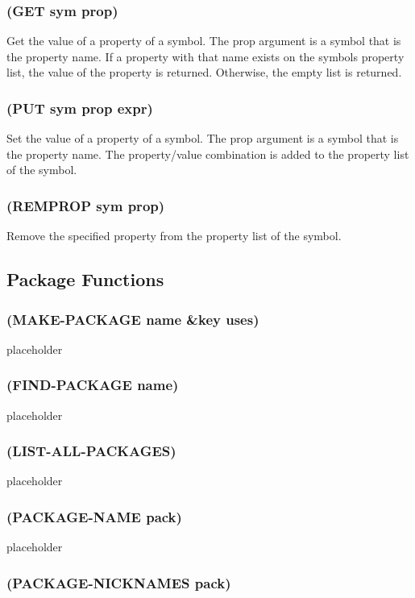 \documentclass[11pt]{article}
\begin{document}
\subsubsection{(GET sym prop)}
\label{sec-4-16-9}

Get the value of a property of a symbol.  The prop argument is a
symbol that is the property name.  If a property with that name
exists on the symbols property list, the value of the property is
returned.  Otherwise, the empty list is returned.
\subsubsection{(PUT sym prop expr)}
\label{sec-4-16-10}

Set the value of a property of a symbol.  The prop argument is a
symbol that is the property name.  The property/value combination is
added to the property list of the symbol.
\subsubsection{(REMPROP sym prop)}
\label{sec-4-16-11}

Remove the specified property from the property list of the symbol.
\subsection{Package Functions}
\label{sec-4-17}

\subsubsection{(MAKE-PACKAGE name \&key uses)}
\label{sec-4-17-1}

placeholder
\subsubsection{(FIND-PACKAGE name)}
\label{sec-4-17-2}

placeholder
\subsubsection{(LIST-ALL-PACKAGES)}
\label{sec-4-17-3}

placeholder
\subsubsection{(PACKAGE-NAME pack)}
\label{sec-4-17-4}

placeholder
\subsubsection{(PACKAGE-NICKNAMES pack)}
\label{sec-4-17-5}
\end{document}
